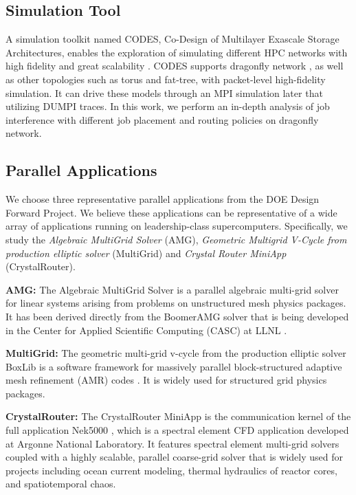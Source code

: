 \documentclass[conference,compsoc]{IEEEtran}
\begin{document}
\subsection{Simulation Tool}
\label{sec:simulation-tool}
A simulation toolkit named CODES, Co-Design of Multilayer Exascale Storage Architectures, enables the exploration of simulating different HPC networks with high fidelity and great scalability \cite{codes}. CODES supports dragonfly network\cite{codes-dragonfly} \cite{misbah-tpds}, as well as other topologies such as torus\cite{misbah-pads-2014}\cite{ning-pads-2011} and fat-tree\cite{ning-pads-2015}, with packet-level high-fidelity simulation. It can drive these models through an MPI simulation later that utilizing DUMPI traces\cite{sst}. In this work, we perform an in-depth analysis of job interference with different job placement and routing policies on dragonfly network.

\subsection{Parallel Applications}
\label{sec: application traces}

We choose three representative parallel applications from the DOE Design Forward Project\cite{designforwardwebpage}. We believe these applications can be representative of a wide array of applications running on leadership-class supercomputers. Specifically, we study the \emph{Algebraic MultiGrid Solver} (AMG), \emph{Geometric Multigrid V-Cycle from production elliptic solver} (MultiGrid) and \emph{Crystal Router MiniApp} (CrystalRouter). 

\textbf{AMG:} The Algebraic MultiGrid Solver is a parallel algebraic multi-grid solver for linear systems arising from problems on unstructured mesh physics packages. It has been derived directly from the BoomerAMG solver that is being developed in the Center for Applied Scientific Computing (CASC) at LLNL \cite{amg}. 


\textbf{MultiGrid:} The geometric multi-grid v-cycle from the production elliptic solver BoxLib is a software framework for massively parallel block-structured adaptive mesh refinement (AMR) codes \cite{boxlib}. It is widely used for structured grid physics packages. 

\textbf{CrystalRouter:} The CrystalRouter MiniApp is the communication kernel of the full application Nek5000 \cite{nek5000}, which is a spectral element CFD application developed at Argonne National Laboratory. It features spectral element multi-grid solvers coupled with a highly scalable, parallel coarse-grid solver that is widely used for projects including ocean current modeling, thermal hydraulics of reactor cores, and spatiotemporal chaos. 
\end{document}
